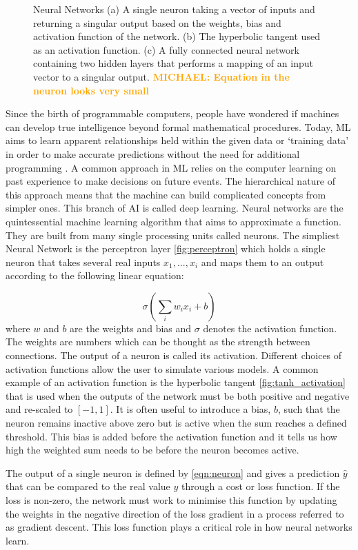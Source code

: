 \documentclass[12pt]{iopart}
\newcommand{\michael}[1]{\textbf{\textcolor{orange}{MICHAEL: #1}}}
\begin{document}
\begin{figure}
\begin{minipage}[b]{0.7\linewidth}
    \end{minipage}
    \caption{Neural Networks (a) A single neuron taking a vector of inputs and returning a singular output based on the weights, bias and activation function of the network. (b) The hyperbolic tangent used as an activation function. (c) A fully connected neural network containing two hidden layers that performs a mapping of an input vector to a singular output. \michael{Equation in the neuron looks very small}}
\end{figure}

Since the birth of programmable computers, people have wondered if machines can develop true intelligence beyond formal mathematical procedures. Today, ML aims to learn apparent relationships held within the given data or `training data' in order to make accurate predictions without the need for additional programming . A common approach in ML relies on the computer learning on past experience to make decisions on future events. The hierarchical nature of this approach means that the machine can build complicated concepts from simpler ones. This branch of AI is called deep learning.
Neural networks are the quintessential machine learning algorithm that aims to approximate a function. They are built from many single processing units called neurons. The simpliest Neural Network is the perceptron layer \cref{fig:perceptron} which holds a single neuron that takes several real inputs $x_{1}, ... , x_{i}$ and maps them to an output according to the following linear equation: 

\begin{equation}
\sigma(\sum_i w_i x_i + b)
\label{eqn:neuron}
\end{equation}
where $w$ and $b$ are the weights and bias and $\sigma$ denotes the activation function. The weights are numbers which can be thought as the strength between connections. The output of a neuron is called its activation. Different choices of activation functions allow the user to simulate various models. A common example of an activation function is the hyperbolic tangent \cref{fig:tanh_activation} that is used when the outputs of the network must be both positive and negative and re-scaled to $[-1,1]$. It is often useful to introduce a bias, $b$, such that the neuron remains inactive above zero but is active when the sum reaches a defined threshold. This bias is added before the activation function and it tells us how high the weighted sum needs to be before the neuron becomes active.

The output of a single neuron is defined by \cref{eqn:neuron} and gives a prediction $\hat{y}$ that can be compared to the real value $y$ through a cost or loss function. If the loss is non-zero, the network must work to minimise this function by updating the weights in the negative direction of the loss gradient in a process referred to as gradient descent. This loss function plays a critical role in how neural networks learn.
\end{document}
